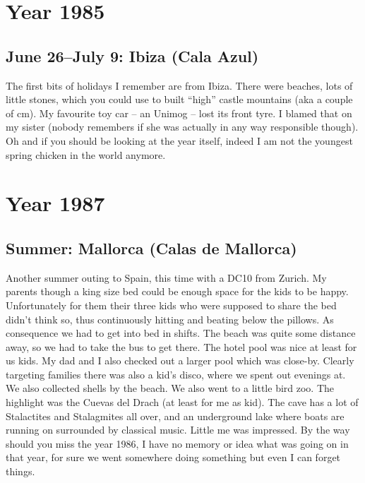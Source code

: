\chapter{Year 1985}
\label{1985}

\section{June 26--July 9: Ibiza (Cala Azul)}
\label{1985:Ibiza}

The first bits of holidays I remember are from Ibiza. There were beaches, lots of little stones, which you could use to built ``high'' castle mountains (aka a couple of cm). My favourite toy car -- an Unimog -- lost its front tyre. I blamed that on my sister (nobody remembers if she was actually in any way responsible though). Oh and if you should be looking at the year itself, indeed I am not the youngest spring chicken in the world anymore.

\chapter{Year 1987}
\label{1987}

\section{Summer: Mallorca (Calas de Mallorca)}
\label{1987:Mallorca}

Another summer outing to Spain, this time with a DC10 from Zurich. My parents though a king size bed could be enough space for the kids to be happy. Unfortunately for them their three kids who were supposed to share the bed didn't think so, thus continuously hitting and beating below the pillows. As consequence we had to get into bed in shifts. The beach was quite some distance away, so we had to take the bus to get there. The hotel pool was nice at least for us kids. My dad and I also checked out a larger pool which was close-by. Clearly targeting families there was also a kid's disco, where we spent out evenings at. We also collected shells by the beach. We also went to a little bird zoo. The highlight was the Cuevas del Drach (at least for me as kid). The cave has a lot of Stalactites and Stalagmites all over, and an underground lake where boats are running on surrounded by classical music. Little me was impressed. By the way should you miss the year 1986, I have no memory or idea what was going on in that year, for sure we went somewhere doing something but even I can forget things.\\

